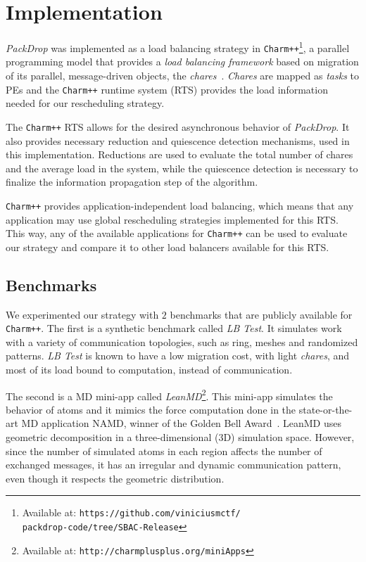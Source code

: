\section{Implementation} \label{sec:impl}

\textit{PackDrop} was implemented as a load balancing strategy in \texttt{Charm++}\footnote{Available at: \texttt{https://github.com/viniciusmctf/\\packdrop-code/tree/SBAC-Release}}, a parallel programming model that provides a \textit{load balancing framework} based on migration of its parallel, message-driven objects, the \textit{chares}~\cite{CharmLOTR,sc14charm}.
\textit{Chares} are mapped as \textit{tasks} to PEs and the \texttt{Charm++} runtime system (RTS) provides the load information needed for our rescheduling strategy.

The \texttt{Charm++} RTS allows for the desired asynchronous behavior of \textit{PackDrop}.
It also provides necessary reduction and quiescence detection mechanisms, used in this implementation.
Reductions are used to evaluate the total number of chares and the average load in the system, while the quiescence detection is necessary to finalize the information propagation step of the algorithm.

\texttt{Charm++} provides application-independent load balancing, which means that any application may use global rescheduling strategies implemented for this RTS.
This way, any of the available applications for \texttt{Charm++} can be used to evaluate our strategy and compare it to other load balancers available for this RTS.


\subsection{Benchmarks} \label{sec:benchmarks}

We experimented our strategy with $2$ benchmarks that are publicly available for \texttt{Charm++}.
The first is a synthetic benchmark called \textit{LB Test}. 
It simulates work with a variety of communication topologies, such as ring, meshes and randomized patterns.
\textit{LB Test} is known to have a low migration cost, with light \textit{chares}, and most of its load bound to computation, instead of communication.

The second is a MD mini-app called \textit{LeanMD}\footnote{Available at: \texttt{http://charmplusplus.org/miniApps}}.
This mini-app simulates the behavior of atoms and it mimics the force computation done in the state-or-the-art MD application NAMD, winner of the Golden Bell Award~\cite{grapevine}.
LeanMD uses geometric decomposition in a three-dimensional ($3$D) simulation space.
However, since the number of simulated atoms in each region affects the number of exchanged messages, it has an irregular and dynamic communication pattern, even though it respects the geometric distribution.

